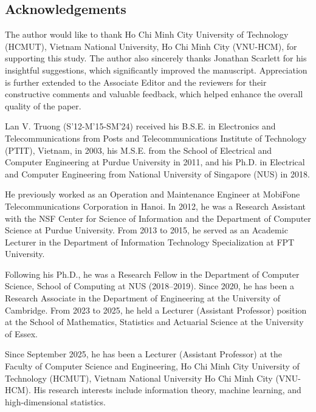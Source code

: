 \documentclass[final]{IEEEtran}
\begin{document}
\subsection*{Acknowledgements} The author would like to thank Ho Chi Minh City University of Technology (HCMUT), Vietnam National University, Ho Chi Minh City (VNU-HCM), for supporting this study. 
The author also sincerely thanks Jonathan Scarlett for his insightful suggestions, which significantly improved the manuscript. Appreciation is further extended to the Associate Editor and the reviewers for their constructive comments and valuable feedback, which helped enhance the overall quality of the paper.


\begin{IEEEbiographynophoto}{Lan V. Truong} (S'12-M'15-SM'24) received his B.S.E. in Electronics and Telecommunications from Posts and Telecommunications Institute of Technology (PTIT), Vietnam, in 2003, his M.S.E. from the School of Electrical and Computer Engineering at Purdue University in 2011, and his Ph.D. in Electrical and Computer Engineering from National University of Singapore (NUS) in 2018.

He previously worked as an Operation and Maintenance Engineer at MobiFone Telecommunications Corporation in Hanoi. In 2012, he was a Research Assistant with the NSF Center for Science of Information and the Department of Computer Science at Purdue University. From 2013 to 2015, he served as an Academic Lecturer in the Department of Information Technology Specialization at FPT University.

Following his Ph.D., he was a Research Fellow in the Department of Computer Science, School of Computing at NUS (2018–2019). Since 2020, he has been a Research Associate in the Department of Engineering at the University of Cambridge. From 2023 to 2025, he held a Lecturer (Assistant Professor) position at the School of Mathematics, Statistics and Actuarial Science at the University of Essex.

Since September 2025, he has been a Lecturer (Assistant Professor) at the Faculty of Computer Science and Engineering, Ho Chi Minh City University of Technology (HCMUT), Vietnam National University Ho Chi Minh City (VNU-HCM). His research interests include information theory, machine learning, and high-dimensional statistics.
\end{IEEEbiographynophoto}
%
%
\end{document}
